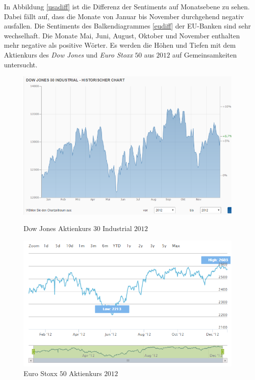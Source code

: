 In Abbildung \ref{usadiff} ist die Differenz der Sentiments auf Monatsebene zu sehen. Dabei fällt auf, dass die Monate von Januar bis November durchgehend negativ ausfallen. Die Sentiments des Balkendiagrammes \ref{eudiff} der EU-Banken sind sehr wechselhaft. Die Monate Mai, Juni, August, Oktober und November enthalten mehr negative als positive Wörter. Es werden die Höhen und Tiefen mit dem Aktienkurs des \textit{Dow Jones} und \textit{Euro Stoxx} $50$ aus $2012$ auf Gemeinsamkeiten untersucht.
 \begin{figure}[H]
 \begin{minipage}[b]{.4\linewidth} %
 	\includegraphics[width=1\textwidth]{Pictures/DowJones2012.png}
 	\caption{Dow Jones Aktienkurs 30 Industrial $2012$ \cite{Dow}}\label{dowjones}
 \end{minipage}
 \hspace{.2\linewidth}%
 \begin{minipage}[b]{.4\linewidth} %
 	\includegraphics[width=1\textwidth]{Pictures/EuroxStoxx.png}
 	\caption{Euro Stoxx $50$ Aktienkurs $2012$ \cite{eurostoxx}} \label{eustoxx}
 \end{minipage}

\end{figure}
